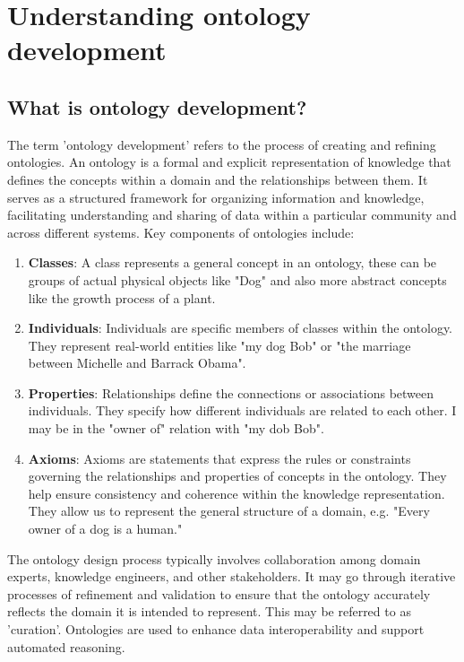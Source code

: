 \section{Understanding ontology development}

\subsection{What is ontology development?}
The term 'ontology development' refers to the process of creating and refining ontologies. An ontology is a formal and explicit representation of knowledge that defines the concepts within a domain and the relationships between them. It serves as a structured framework for organizing information and knowledge, facilitating understanding and sharing of data within a particular community and across different systems. Key components of ontologies include:

\begin{enumerate}
    \item \textbf{Classes}: A class represents a general concept in an ontology, these can be groups of actual physical objects like "Dog" and also more abstract concepts like the growth process of a plant.
    
    \item \textbf{Individuals}: Individuals are specific members of classes within the ontology. They represent real-world entities like "my dog Bob" or "the marriage between Michelle and Barrack Obama".
    
    \item \textbf{Properties}: Relationships define the connections or associations between individuals. They specify how different individuals are related to each other. I may be in the "owner of" relation with "my dob Bob".

    \item \textbf{Axioms}: Axioms are statements that express the rules or constraints governing the relationships and properties of concepts in the ontology. They help ensure consistency and coherence within the knowledge representation. They allow us to represent the general structure of a domain, e.g. "Every owner of a dog is a human."

\end{enumerate}

The ontology design process typically involves collaboration among domain experts, knowledge engineers, and other stakeholders. It may go through iterative processes of refinement and validation to ensure that the ontology accurately reflects the domain it is intended to represent. This may be referred to as 'curation'. Ontologies are used to enhance data interoperability and support automated reasoning.


